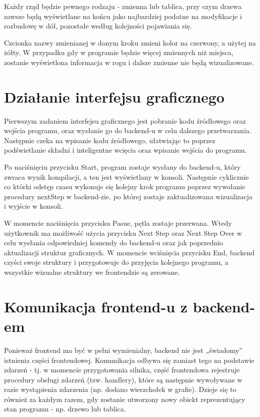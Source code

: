 \documentclass[a4paper,twoside,openright,11pt]{report}
\begin{document}
\par Każdy rząd będzie pewnego rodzaju - zmienna lub tablica, przy czym drzewa zawsze będą wyświetlane na końcu jako najbardziej podatne na modyfikacje i rozbudowę w dół, pozostałe według kolejności pojawiania się. 
\par Czcionka nazwy zmienianej w danym kroku zmieni kolor na czerwony, a użytej na żółty. W przypadku gdy w programie będzie więcej zmiennych niż miejsca, zostanie wyświetlona informacja w rogu i dalsze zmienne nie będą wizualizowane. 

  \section{Działanie interfejsu graficznego}
\par Pierwszym zadaniem interfejsu graficznego jest pobranie kodu źródłowego oraz wejścia programu, oraz wysłanie go do backend-u w celu dalszego przetwarzania. Następnie czeka na wpisanie kodu źródłowego, ułatwiając to poprzez podświetlanie składni i inteligentne wcięcia oraz wpisanie wejścia do programu. 
\par Po naciśnięciu przycisku Start, program zostaje wysłany do backend-u, który zwraca wynik kompilacji, a ten jest wyświetlany w konsoli. Następnie cyklicznie co którki odstęp czasu wykonuje się kolejny krok programu poprzez wywołanie procedury nextStep w backend-zie, po której zostaje zaktualizowana wizualizacja i wyjście w konsoli.
\par W momencie naciśnięcia przycisku Pasue, pętla zostaje przerwana. Wtedy użytkownik ma możliwość użycia przycisku Next Step oraz Next Step Over w celu wysłania odpowiedniej komendy do backend-u oraz jak poprzednio aktualizacji struktur graficznych. W momencie wciśnięcia przycisku End, backend czyści swoje struktury i przygotowuje do przyjęcia kolejnego programu, a wszystkie wizualne struktury we frontendzie są zerowane.

  \section{Komunikacja frontend-u z backend-em}
\par Ponieważ frontend ma być w pełni wymienialny, backend nie jest „świadomy” istnienia części frontendowej. Komunikacja odbywa się zamiast tego na podstawie zdarzeń - tj. w momencie
przygotowania silnika, część frontendowa rejestruje procedury obsługi zdarzeń (tzw. handlery), które są następnie wywoływane w razie wystąpienia zdarzenia (np. dodano wierzchołek w grafie). Dzieje się to również za każdym razem, gdy zostanie utworzony nowy obiekt reprezentujący stan programu - np. drzewo lub tablica.
\end{document}
